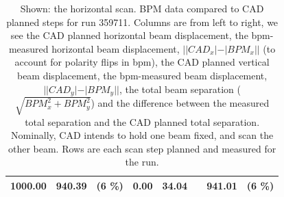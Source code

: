 \begin{table}[ht]
\begin{tabular}{c c c c c c c c}
    1000.00 & 940.39 &  (6 \%) & 0.00 & 34.04 &  & 941.01 &  (6 \%)\\
    \bottomrule
  \end{tabular}
  \caption{ 
    Shown: the horizontal scan. BPM data compared to CAD planned steps for run
    359711.  Columns are from left to right, we see the CAD planned horizontal
    beam displacement, the bpm-measured horizontal beam displacement,
    $||CAD_{x}| - |BPM_{x}||$ (to account for polarity flips in bpm), the CAD
    planned vertical beam displacement, the bpm-measured beam displacement,
    $||CAD_{y}| - |BPM_{y}||$, the total beam separation
    ($\sqrt{BPM_{x}^2+BPM_{y}^2}$) and the difference between the measured total
    separation and the CAD planned total separation. Nominally, CAD intends to
    hold one beam fixed, and scan the other beam. Rows are each scan step
    planned and measured for the run. 
  }
  \label{fig:bpm_data_example_h}
\end{table}


